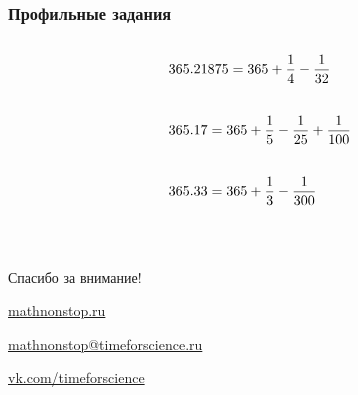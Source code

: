 \documentclass[aspectratio=1610,12pt]{beamer}
\begin{document}
\begin{frame} \frametitle{Профильные задания}

\begin{align*}
	& 365.21875 = 365 + \frac{1}{4} - \frac{1}{32}
		\vphantom{\int\limits_{0_0}^{0^0}} \\
	& 365.17 = 365 + \frac{1}{5} - \frac{1}{25} + \frac{1}{100}
		\vphantom{\int\limits_{0_0}^{0^0}} \\
	& 365.33 = 365 + \frac{1}{3} - \frac{1}{300}
		\vphantom{\int\limits_{0_0}^{0^0}} \\
\end{align*}

\end{frame}

\begin{frame} \begin{center}
\ 

	{\Large Спасибо за внимание!} \vspace{0.4cm}

	{\large \url{mathnonstop.ru}}

	{\large \url{mathnonstop@timeforscience.ru}}

	{\large \url{vk.com/timeforscience}}
\end{center} \end{frame}
\end{document}
